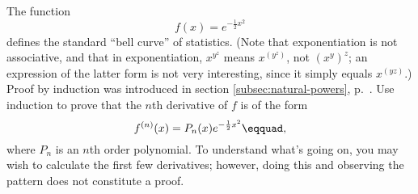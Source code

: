 The function
\begin{equation*}
  f(x) = e^{-\frac{1}{2}x^2}
\end{equation*}
defines the standard ``bell curve'' of statistics.
(Note that exponentiation is not associative,
and that in exponentiation, $x^{y^z}$ means $x^{(y^z)}$, not $(x^y)^z$; an expression of
the latter form is not very interesting, since it simply equals $x^{(yz)}$.)\\

Proof by induction was introduced in section \ref{subsec:natural-powers}, p.~\pageref{induction}.
Use induction to prove that the $n$th derivative of $f$ is of the form
\begin{equation*}
  f^{(n)}(x) = P_n(x)e^{-\frac{1}{2}x^2}\eqquad,
\end{equation*}
where $P_n$ is an $n$th order polynomial.
To understand what's going on, you may wish to calculate the first few derivatives; however,
doing this and observing the pattern does not constitute a proof.
